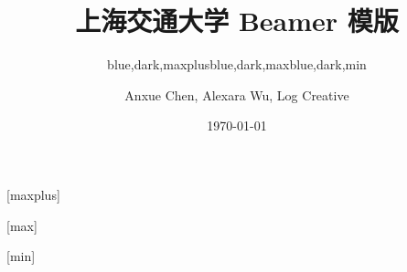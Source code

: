 \documentclass[]{ctexbeamer}
\begin{document}
\title[SJTU Beamer Template] %
{\textbf{上海交通大学 Beamer 模版}} %

\author[Anxue Chen, Alexara Wu, Log Creative]
{Anxue Chen, Alexara Wu, Log Creative}


\date{\today}

\subtitle{blue,dark,maxplus}
\logo{\resizebox{!}{0.7cm}{\cnlogo}}
[maxplus]
\maketitle

\subtitle{blue,dark,max}
\logo{\resizebox{!}{1cm}{\sjtubadge}}
\titlegraphic{\sjtubg[opacity=0.2]}
[max]
\maketitle

\subtitle{blue,dark,min}
\logo{\resizebox{!}{0.7cm}{\enlogo}}
[min]
\maketitle
\end{document}
